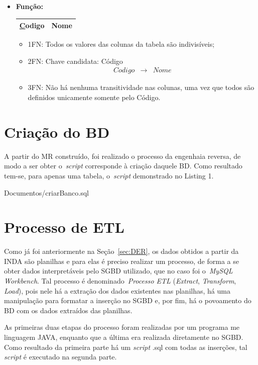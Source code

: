 \documentclass [12pt]{article}
\begin{document}
\begin{itemize}
		\item \textbf{Função:}
			\begin{table}[h]
				\centering
				\begin{tabular}{|c|c|} \hline
					{\ul Codigo} & Nome \\ \hline
				\end{tabular}
			\end{table}
			
			\begin{itemize}
				\item 1FN: Todos os valores das colunas da tabela são indivisíveis;
				\item 2FN: Chave candidata: Código
					\begin{eqnarray*}
						Codigo & \rightarrow & Nome
					\end{eqnarray*}
				\item 3FN: Não há nenhuma transitividade nas colunas, uma vez que todos são definidos unicamente somente pelo Código.
			\end{itemize}
	\end{itemize}
		
	\section{Criação do BD}
		\label{sec:BDcreate}
	A partir do MR construído, foi realizado o processo da engenhaia reversa, de modo a ser obter o~\emph{script} corresponde à criação daquele BD. Como resultado tem-se, para apenas uma tabela, o~\emph{script} demonstrado no Listing 1.
	
	
					{Documentos/criarBanco.sql}
		
	\section{Processo de ETL}
		\label{sec:ETL}
	Como já foi anteriormente na Seção~\ref{sec:DER}, os dados obtidos a partir da INDA são planilhas e para elas é preciso realizar um processo, de forma a se obter dados interpretáveis pelo SGBD utilizado, que no caso foi o~\emph{MySQL Workbench}. Tal processo é denominado~\emph{Processo ETL} (\emph{Extract}, \emph{Transform}, \emph{Load}), pois nele há a extração dos dados existentes nas planilhas, há uma manipulação para formatar a inserção no SGBD e, por fim, há o povoamento do BD com os dados extraídos das planilhas.
	
	As primeiras duas etapas do processo foram realizadas por um programa me linguagem JAVA, enquanto que a última era realizada diretamente no SGBD. Como resultado da primeira parte há um \emph{script} .sql com todas as inserções, tal \emph{script} é executado na segunda parte.
\end{document}
